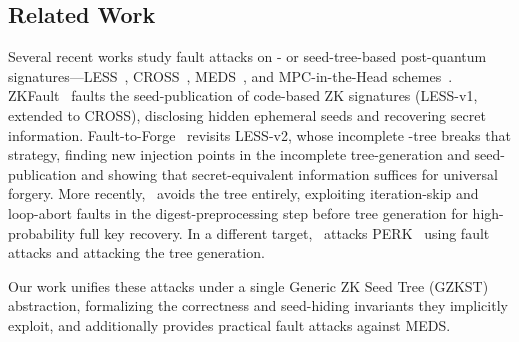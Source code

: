 \subsection{Related Work}
\label{sec:relwork}
Several recent works study fault attacks on \GGM{}- or seed-tree-based 
post-quantum signatures---LESS~\cite{LESS-spec}, CROSS~\cite{CROSSspec}, 
MEDS~\cite{ChouNPRRST23}, and MPC-in-the-Head schemes~\cite{ryde2025,FAESTv22025}. 
ZKFault~\cite{ZKFault} faults the seed-publication of code-based ZK signatures 
(LESS-v1, extended to CROSS), disclosing hidden ephemeral seeds and 
recovering secret information. Fault-to-Forge~\cite{FaultToForge2025} revisits 
LESS-v2, whose incomplete \GGM{}-tree breaks that strategy, finding new 
injection points in the incomplete tree-generation and seed-publication and 
showing that secret-equivalent information suffices for universal forgery. 
More recently,~\cite{HuangHHYSTY26} avoids the tree entirely, exploiting 
iteration-skip and loop-abort faults in the digest-preprocessing step before 
tree generation for high-probability full key recovery.
In a different target,~\cite{cryptoeprint:2026/1266} attacks 
PERK~\cite{BettaiebBDEGKP24} using fault attacks and attacking the 
tree generation.

Our work unifies these attacks under a single Generic ZK Seed Tree (GZKST) 
abstraction, formalizing the correctness and seed-hiding invariants they 
implicitly exploit, and additionally provides practical fault attacks against 
MEDS.


